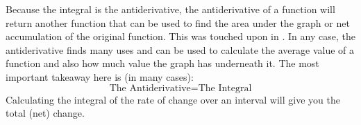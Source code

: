 \documentclass[../revisedmain.tex]{subfiles}
\begin{document}
Because the integral is the antiderivative, the antiderivative of a function will return another function that can be used to find the area under the graph or net accumulation of the original function. This was touched upon in . In any case, the antiderivative finds many uses and can be used to calculate the average value of a function and also how much value the graph has underneath it. The most important takeaway here is (in many cases):$$\text{The Antiderivative} = \text{The Integral}$$Calculating the integral of the rate of change over an interval will give you the total (net) change.\\
\end{document}
